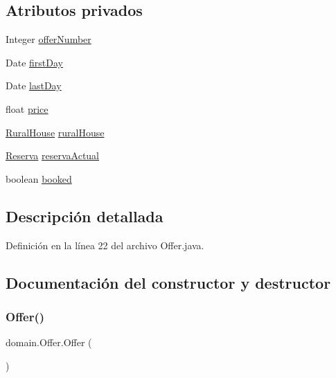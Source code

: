 \subsection*{Atributos privados}
\begin{DoxyCompactItemize}
\item 
Integer \mbox{\hyperlink{classdomain_1_1_offer_af77beec2989adcfb9b7b7ef399f9b363}{offer\+Number}}
\item 
Date \mbox{\hyperlink{classdomain_1_1_offer_ac30c7d7ca38555fecc523259c15bd6b0}{first\+Day}}
\item 
Date \mbox{\hyperlink{classdomain_1_1_offer_a4d415274c0e120dd3e66e4ad46d7e2b2}{last\+Day}}
\item 
float \mbox{\hyperlink{classdomain_1_1_offer_a194cfe9363c5bd9e745f56978b03e7fd}{price}}
\item 
\mbox{\hyperlink{classdomain_1_1_rural_house}{Rural\+House}} \mbox{\hyperlink{classdomain_1_1_offer_a122573abd92911b25cde7d7e84f488f5}{rural\+House}}
\item 
\mbox{\hyperlink{classdomain_1_1_reserva}{Reserva}} \mbox{\hyperlink{classdomain_1_1_offer_a242b39ce62d475bd64ce18aff2bbfe4f}{reserva\+Actual}}
\item 
boolean \mbox{\hyperlink{classdomain_1_1_offer_afe1b48d0d80d84147a51b8dff9dfb50d}{booked}}
\end{DoxyCompactItemize}


\subsection{Descripción detallada}


Definición en la línea 22 del archivo Offer.\+java.



\subsection{Documentación del constructor y destructor}
\mbox{\label{classdomain_1_1_offer_ae82665e8df101e5a20b41dc06f74a789}} 
\subsubsection{\texorpdfstring{Offer()}{Offer()}\hspace{0.1cm}{\footnotesize\ttfamily [1/2]}}
{\footnotesize\ttfamily domain.\+Offer.\+Offer (\begin{DoxyParamCaption}{ }\end{DoxyParamCaption})}



